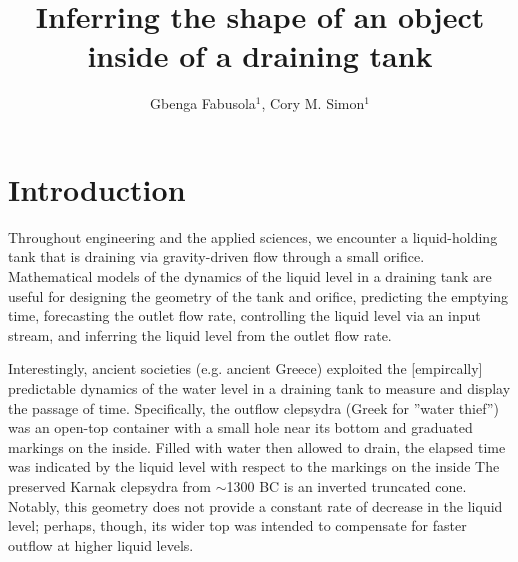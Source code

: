 \documentclass[openacc]{rsproca_new}%
\begin{document}
\title{Inferring the shape of an object inside of a draining tank}

\author{%
Gbenga Fabusola$^{1}$, 
Cory M. Simon$^{1}$
}

\address{$^{1}$School of Chemical, Biological, and Environmental Engineering. Oregon State University. Corvallis, OR, USA.
}

\subject{applied mathematics, chemical engineering}



\begin{abstract}

\absbreak %
\end{abstract}

\rsbreak


\section{Introduction}
Throughout engineering and the applied sciences, we encounter a liquid-holding tank that is draining via gravity-driven flow through a small orifice.
Mathematical models of the dynamics of the liquid level in a draining tank are useful for designing the geometry of the tank and orifice, predicting the emptying time, forecasting the outlet flow rate, controlling the liquid level via an input stream, and inferring the liquid level from the outlet flow rate.

Interestingly, ancient societies (e.g. ancient Greece) exploited the [empircally] predictable dynamics of the water level in a draining tank to measure and display the passage of time.
Specifically, the outflow clepsydra (Greek for ''water thief'') was an open-top container with a small hole near its bottom and graduated markings on the inside. 
Filled with water then allowed to drain, the elapsed time was indicated by the liquid level with respect to the markings on the inside \cite{bedini1962compartmented,hwang2021historical,ritner2016oriental,hejun1987research,schomberg2018karnak,mills1982newton}
The preserved Karnak clepsydra from $\sim$1300 BC \cite{schomberg2018karnak} is an inverted truncated cone. Notably, this geometry does not provide a constant rate of decrease in the liquid level; perhaps, though, its wider top was intended to compensate for faster outflow at higher liquid levels.
\end{document}
